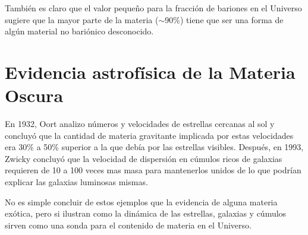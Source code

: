 También es claro que el valor pequeño para la fracción de bariones en el Universo sugiere que la mayor parte de la materia ($\sim 90\%$) tiene que ser una forma de algún material no bariónico desconocido.


\newpage
\section{Evidencia astrofísica de la Materia Oscura}
En 1932, Oort analizo números y velocidades de estrellas cercanas al sol y concluyó que la cantidad de materia gravitante implicada por estas velocidades era 30\% a 50\% superior a la que debía por las estrellas visibles. Después, en 1993, Zwicky concluyó que la velocidad de dispersión en cúmulos ricos de galaxias requieren de 10 a 100 veces mas masa para mantenerlos unidos de lo que podrían explicar las galaxias luminosas mismas.

No es simple concluir de estos ejemplos que la evidencia de alguna materia exótica, pero si ilustran como la dinámica de las estrellas, galaxias y cúmulos sirven como una sonda para el contenido de materia en el Universo.



